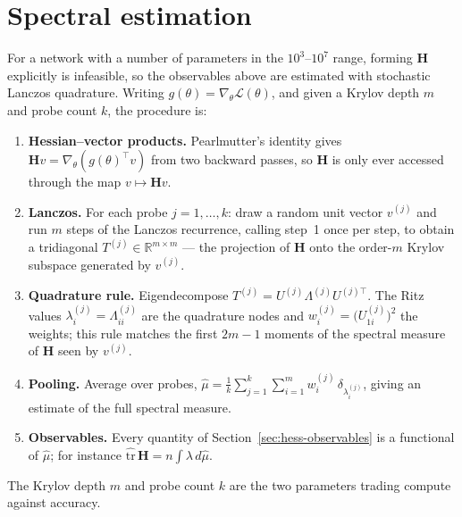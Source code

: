 \documentclass[11pt,a4paper]{article}
\newcommand{\R}{\mathbb{R}}
\newcommand{\bH}{\mathbf{H}}
\begin{document}
\section{Spectral estimation}
\label{sec:hess-lanczos}

For a network with a number of parameters in the $10^3$--$10^7$ range, forming
$\bH$ explicitly is infeasible, so the observables above are estimated with
stochastic Lanczos quadrature. Writing
$g(\theta) = \nabla_\theta \mathcal{L}(\theta)$, and given a Krylov depth $m$
and probe count $k$, the procedure is:

\begin{enumerate}[leftmargin=*,itemsep=1pt]
    \item \textbf{Hessian--vector products.} Pearlmutter's identity gives
    $\bH v = \nabla_\theta\!\left(g(\theta)^\top v\right)$ from two backward
    passes, so $\bH$ is only ever accessed through the map $v \mapsto \bH v$.
    \item \textbf{Lanczos.} For each probe $j = 1,\dots,k$: draw a random unit
    vector $v^{(j)}$ and run $m$ steps of the Lanczos recurrence, calling
    step~1 once per step, to obtain a tridiagonal
    $T^{(j)} \in \R^{m \times m}$ --- the projection of $\bH$ onto the order-$m$
    Krylov subspace generated by $v^{(j)}$.
    \item \textbf{Quadrature rule.} Eigendecompose
    $T^{(j)} = U^{(j)} \Lambda^{(j)} U^{(j)\top}$. The Ritz values
    $\lambda_i^{(j)} = \Lambda^{(j)}_{ii}$ are the quadrature nodes and
    $w_i^{(j)} = \big(U^{(j)}_{1i}\big)^2$ the weights; this rule matches the
    first $2m-1$ moments of the spectral measure of $\bH$ seen by $v^{(j)}$.
    \item \textbf{Pooling.} Average over probes,
    $\hat\mu = \frac{1}{k}\sum_{j=1}^{k}\sum_{i=1}^{m} w_i^{(j)}\,
    \delta_{\lambda_i^{(j)}}$, giving an estimate of the full spectral measure.
    \item \textbf{Observables.} Every quantity of
    Section~\ref{sec:hess-observables} is a functional of $\hat\mu$; for
    instance $\widehat{\mathrm{tr}}\,\bH = n\!\int\!\lambda \, d\hat\mu$.
\end{enumerate}

The Krylov depth $m$ and probe count $k$ are the two parameters trading compute
against accuracy.

\end{document}
